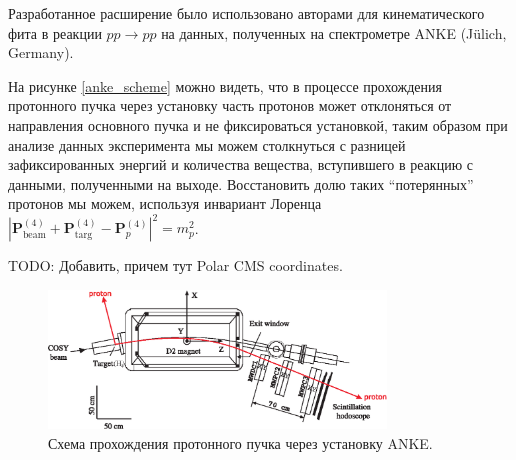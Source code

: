 Разработанное расширение было использовано авторами для кинематического фита в реакции $pp \to pp$ на данных, полученных на спектрометре ANKE (Jülich, Germany)\cite{anke}.

На рисунке \eqref{anke_scheme} можно видеть, что в процессе прохождения протонного пучка через установку часть протонов может отклоняться от направления основного пучка и не фиксироваться установкой, таким образом при анализе данных эксперимента мы можем столкнуться с разницей зафиксированных энергий и количества вещества, вступившего в реакцию с данными, полученными на выходе. Восстановить долю таких ``потерянных'' протонов мы можем, используя инвариант Лоренца $\left|\boldsymbol{P}^{(4)}_\mathrm{beam}+\boldsymbol{P}^{(4)}_\mathrm{targ}-\boldsymbol{P}^{(4)}_p\right|^2 = m_p^2$.

TODO: Добавить, причем тут Polar CMS coordinates.

\begin{figure}[h]
\centering
\centering\includegraphics[width=0.8\textwidth]{pics/setup_.eps}
\caption{
Схема прохождения протонного пучка через установку ANKE.
}
\label{anke_scheme}
\end{figure}


